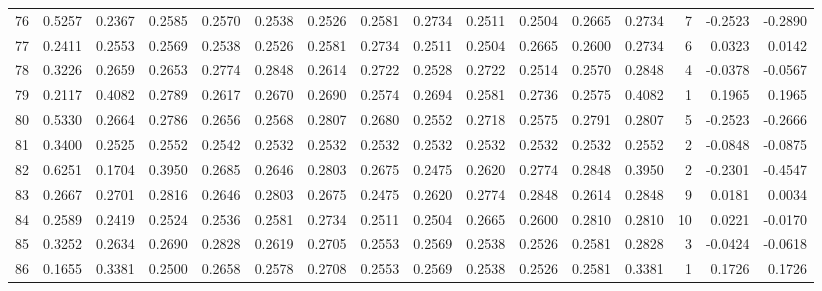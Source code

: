 \begin{tabular}{lrrrrrrrrrrrrrrr}
76  &      0.5257 &  0.2367 &  0.2585 &  0.2570 &  0.2538 &  0.2526 &  0.2581 &  0.2734 &  0.2511 &  0.2504 &   0.2665 &     0.2734 &      7 &                   -0.2523 &                    -0.2890 \\
77  &      0.2411 &  0.2553 &  0.2569 &  0.2538 &  0.2526 &  0.2581 &  0.2734 &  0.2511 &  0.2504 &  0.2665 &   0.2600 &     0.2734 &      6 &                    0.0323 &                     0.0142 \\
78  &      0.3226 &  0.2659 &  0.2653 &  0.2774 &  0.2848 &  0.2614 &  0.2722 &  0.2528 &  0.2722 &  0.2514 &   0.2570 &     0.2848 &      4 &                   -0.0378 &                    -0.0567 \\
79  &      0.2117 &  0.4082 &  0.2789 &  0.2617 &  0.2670 &  0.2690 &  0.2574 &  0.2694 &  0.2581 &  0.2736 &   0.2575 &     0.4082 &      1 &                    0.1965 &                     0.1965 \\
80  &      0.5330 &  0.2664 &  0.2786 &  0.2656 &  0.2568 &  0.2807 &  0.2680 &  0.2552 &  0.2718 &  0.2575 &   0.2791 &     0.2807 &      5 &                   -0.2523 &                    -0.2666 \\
81  &      0.3400 &  0.2525 &  0.2552 &  0.2542 &  0.2532 &  0.2532 &  0.2532 &  0.2532 &  0.2532 &  0.2532 &   0.2532 &     0.2552 &      2 &                   -0.0848 &                    -0.0875 \\
82  &      0.6251 &  0.1704 &  0.3950 &  0.2685 &  0.2646 &  0.2803 &  0.2675 &  0.2475 &  0.2620 &  0.2774 &   0.2848 &     0.3950 &      2 &                   -0.2301 &                    -0.4547 \\
83  &      0.2667 &  0.2701 &  0.2816 &  0.2646 &  0.2803 &  0.2675 &  0.2475 &  0.2620 &  0.2774 &  0.2848 &   0.2614 &     0.2848 &      9 &                    0.0181 &                     0.0034 \\
84  &      0.2589 &  0.2419 &  0.2524 &  0.2536 &  0.2581 &  0.2734 &  0.2511 &  0.2504 &  0.2665 &  0.2600 &   0.2810 &     0.2810 &     10 &                    0.0221 &                    -0.0170 \\
85  &      0.3252 &  0.2634 &  0.2690 &  0.2828 &  0.2619 &  0.2705 &  0.2553 &  0.2569 &  0.2538 &  0.2526 &   0.2581 &     0.2828 &      3 &                   -0.0424 &                    -0.0618 \\
86  &      0.1655 &  0.3381 &  0.2500 &  0.2658 &  0.2578 &  0.2708 &  0.2553 &  0.2569 &  0.2538 &  0.2526 &   0.2581 &     0.3381 &      1 &                    0.1726 &                     0.1726 \\

\end{tabular}
